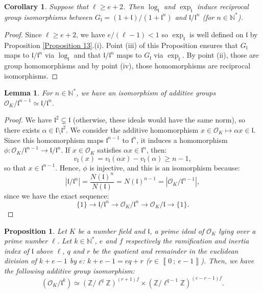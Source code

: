 \documentclass[a4paper,10pt,notitlepage]{report}
\theoremstyle{definition}
\theoremstyle{plain}
\newtheorem{Proposition}[Definition]{Proposition}
\newtheorem{Lemma}[Definition]{Lemma}
\newtheorem{Corollary}[Definition]{Corollary}
\theoremstyle{definition}
\newcommand{\N}{\mathbb{N}}
\newcommand{\Z}{\mathbb{Z}}
\newcommand{\mO}{\mathcal{O}}
\renewcommand{\i}[2]{\left\llbracket #1~;~#2\right\rrbracket}
\renewcommand{\(}{\left(}
\renewcommand{\)}{\right)}
\newcommand{\mf}[1]{\mathfrak{#1}}
\begin{document}
\begin{Corollary}
Suppose that $\ell\geq e+2$. Then $\log_{\mf{l}}$ and $\exp_{\mf{l}}$ induce reciprocal group isomorphisms between $G_{\mf{l}}=(1+\mf{l})/(1+\mf{l}^n)$ and $\mf{l}/\mf{l}^n$ (for $n\in\N^*$).
\end{Corollary}

\begin{proof}
Since $\ell\geq e+2$, we have $e/(\ell-1)<1$ so $\exp_{\mf{l}}$ is well defined on $\mf{l}$ by Proposition \ref{Proposition 13}.(i). Point (iii) of this Proposition ensures that $G_{\mf{l}}$ maps to $\mf{l}/\mf{l}^n$ via $\log_{\mf{l}}$ and that $\mf{l}/\mf{l}^n$ maps to $G_{\mf{l}}$ via $\exp_{\mf{l}}$. By point (ii), those are group homomorphisms and by point (iv), those homomorphisms are reciprocal isomorphisms.
\end{proof}

\begin{Lemma}\label{Lemma 17}
For $n\in\N^*$, we have an isomorphism of additive groups $\mO_K/\mf{l}^{n-1}\simeq \mf{l}/\mf{l}^{n}$.
\end{Lemma}

\begin{proof}
We have $\mf{l}^2\subsetneq \mf{l}$ (otherwise, these ideals would have the same norm), so there exists $\alpha\in\mf{l}\setminus\mf{l}^2$. We consider the additive homomorphism $x\in\mO_K\longmapsto \alpha x\in\mf{l}$. Since this homomorphism maps $\mf{l}^{n-1}$ to $\mf{l}^n$, it induces a homomorphism $\phi:\mO_K/\mf{l}^{n-1}\longrightarrow \mf{l}/\mf{l}^{n}$. If $x\in\mO_K$ satisfies $\alpha x\in\mf{l}^n$, then:
\[v_{\mf{l}}(x)=v_{\mf{l}}(\alpha x)-v_{\mf{l}}(\alpha)\geq n-1,\]
so that $x\in \mf{l}^{n-1}$. Hence, $\phi$ is injective, and this is an isomorphism because:
\[|\mf{l}/\mf{l}^n|=\frac{N(\mf{l})^n}{N(\mf{l})}=N(\mf{l})^{n-1}=|\mO_K/\mf{l}^{n-1}|,\]
since we have the exact sequence:
\[\{1\}\longrightarrow \mf{l}/\mf{l}^n\longrightarrow \mO_K/\mf{l}^n\longrightarrow\mO_K/\mf{l}\longrightarrow\{1\}.\]
\end{proof}

\begin{Proposition}\label{Proposition 14}
Let  $K$ be a number field and $\mf{l}$, a prime ideal of $\mO_K$ lying over a prime number $\ell$. Let $k\in\N^*$, $e$ and $f$ respectively the ramification and inertia index of $\mf{l}$ above $\ell$, $q$ and $r$ be the quotient and remainder in the euclidean division of $k+e-1$ by $e$: $k+e-1=eq+r$ ($r\in\i{0}{e-1}$). Then, we have the following additive group isomorphism:
\[(\mO_K/\mf{l}^k)\simeq (\Z/\ell^q\Z)^{(r+1)f}\times(\Z/\ell^{q-1}\Z)^{(e-r-1)f}.\]
\end{Proposition}
\end{document}
